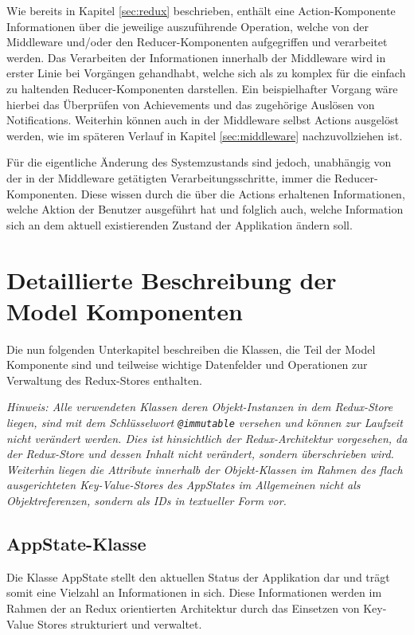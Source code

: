 \documentclass[bibliography=totoc,listof=totoc,BCOR=5mm,DIV=12,oneside]{scrbook}
\begin{document}
\par \bigskip Wie bereits in Kapitel \ref{sec:redux} beschrieben, enthält eine Action-Komponente Informationen über die jeweilige auszuführende Operation, welche von der Middleware und/oder den Reducer-Komponenten aufgegriffen und verarbeitet werden. Das Verarbeiten der Informationen innerhalb der Middleware wird in erster Linie bei Vorgängen gehandhabt, welche sich als zu komplex für die einfach zu haltenden Reducer-Komponenten darstellen. Ein beispielhafter Vorgang wäre hierbei das Überprüfen von Achievements und das zugehörige Auslösen von Notifications. Weiterhin können auch in der Middleware selbst Actions ausgelöst werden, wie im späteren Verlauf in Kapitel \ref{sec:middleware} nachzuvollziehen ist. 

\par \bigskip Für die eigentliche Änderung des Systemzustands sind jedoch, unabhängig von der in der Middleware getätigten Verarbeitungsschritte, immer die Reducer-Komponenten. Diese \grqq wissen\grqq{} durch die über die Actions erhaltenen Informationen, welche Aktion der Benutzer ausgeführt hat und folglich auch, welche Information sich an dem aktuell existierenden Zustand der Applikation ändern soll.

\section{Detaillierte Beschreibung der Model Komponenten}
\label{sec:komponentenDetails}
\par \bigskip Die nun folgenden Unterkapitel beschreiben die Klassen, die Teil der Model Komponente sind und teilweise wichtige Datenfelder und Operationen zur Verwaltung des Redux-Stores enthalten.

\par \bigskip \textit{Hinweis: Alle verwendeten Klassen deren Objekt-Instanzen in dem Redux-Store liegen, sind mit dem Schlüsselwort \texttt{@immutable} versehen und können zur Laufzeit nicht verändert werden. Dies ist hinsichtlich der Redux-Architektur vorgesehen, da der Redux-Store und dessen Inhalt nicht verändert, sondern überschrieben wird. Weiterhin liegen die Attribute innerhalb der Objekt-Klassen im Rahmen des flach ausgerichteten Key-Value-Stores des AppStates im Allgemeinen nicht als Objektreferenzen, sondern als IDs in textueller Form vor.}

\subsection{AppState-Klasse}
\par Die Klasse AppState stellt den aktuellen Status der Applikation dar und trägt somit eine Vielzahl an Informationen in sich. Diese Informationen werden im Rahmen der an Redux orientierten Architektur durch das Einsetzen von Key-Value Stores strukturiert und verwaltet. 
\end{document}
